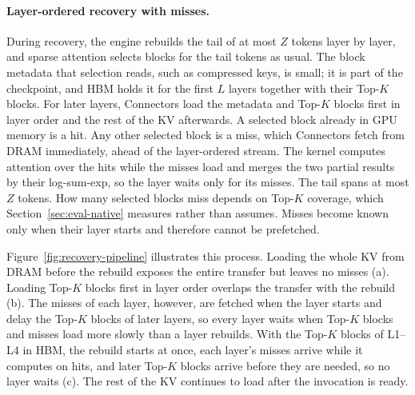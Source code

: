 \paragraph{Layer-ordered recovery with misses.}
During recovery, the engine rebuilds the tail of at most $Z$ tokens layer
by layer, and sparse attention selects blocks for the tail tokens as
usual. The block metadata that selection reads, such as compressed keys,
is small; it is part of the checkpoint, and HBM holds it for the first $L$
layers together with their Top-$K$ blocks. For later layers, Connectors
load the metadata and Top-$K$ blocks first in layer order and the rest of
the KV afterwards. A selected block already in GPU memory is a hit. Any
other selected block is a miss, which Connectors fetch from DRAM
immediately, ahead of the layer-ordered stream. The kernel computes
attention over the hits while the misses load and merges the two partial
results by their log-sum-exp, so the layer waits only for its misses.
The tail spans at most $Z$ tokens. How many selected blocks miss depends on
Top-$K$ coverage, which Section~\ref{sec:eval-native} measures rather than
assumes. Misses become known only when their layer starts and therefore
cannot be prefetched.

Figure~\ref{fig:recovery-pipeline} illustrates this process. Loading the
whole KV from DRAM before the rebuild exposes the entire transfer but
leaves no misses (a). Loading Top-$K$ blocks first in layer order overlaps
the transfer with the rebuild (b). The misses of each layer, however, are
fetched when the layer starts and delay the Top-$K$ blocks of later
layers, so every layer waits when Top-$K$ blocks and misses load more
slowly than a layer rebuilds. With the Top-$K$ blocks of L1--L4 in HBM,
the rebuild starts at once, each layer's misses arrive while it computes
on hits, and later Top-$K$ blocks arrive before they are needed, so no
layer waits (c). The rest of the KV continues to load after the
invocation is ready.

